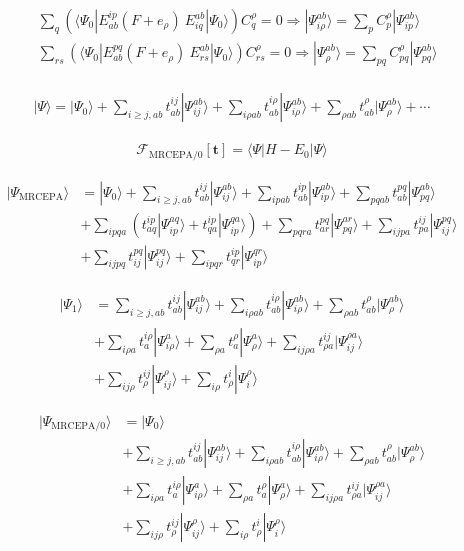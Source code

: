 \documentclass[11pt,pra,aps]{revtex4}
\begin{document}
\begin{align}
  &\sum_q \left(\langle\Psi_0|E_{ab}^{ip}(F+e_\rho)\ E^{ab}_{iq}|\Psi_0\rangle\right) C_q^\rho=0\Rightarrow |\Psi_{i\rho}^{ab}\rangle=\sum_{p} C_{p}^{\rho} |\Psi_{ip}^{ab}\rangle \\
  &\sum_{rs} \left(\langle\Psi_0|E_{ab}^{pq}(F+e_\rho)\ E^{ab}_{rs}|\Psi_0\rangle\right) C_{rs}^\rho=0\Rightarrow |\Psi_{\rho}^{ab}\rangle=\sum_{pq} C_{pq}^{\rho} |\Psi_{pq}^{ab}\rangle \\ 
\end{align}

\begin{align}
|\Psi\rangle=|\Psi_0\rangle+\sum_{i\geq j,ab}t_{ab}^{ij}|\Psi_{ij}^{ab}\rangle+\sum_{i\rho ab}t_{ab}^{i\rho}|\Psi_{i\rho}^{ab}\rangle+\sum_{\rho ab}t_{ab}^{\rho}|\Psi_{\rho}^{ab}\rangle+\cdots
\end{align}

\begin{align}
  \mathscr{F}_\text{MRCEPA/0}[\mathbf{t}]=\langle\Psi|H-E_0|\Psi\rangle
\end{align}

\begin{align}
  |\Psi_\text{MRCEPA}\rangle&=|\Psi_0\rangle+\sum_{i\geq j,ab}t_{ab}^{ij}|\Psi_{ij}^{ab}\rangle+\sum_{ip ab}t_{ab}^{ip}|\Psi_{ip}^{ab}\rangle+\sum_{pq ab}t_{ab}^{pq}|\Psi_{pq}^{ab}\rangle \\
  &+\sum_{ipqa}\left(t^{ip}_{aq}|\Psi_{ip}^{aq}\rangle+t^{ip}_{qa}|\Psi_{ip}^{qa}\rangle\right)+\sum_{pqra}t_{ar}^{pq}|\Psi_{pq}^{ar}\rangle+\sum_{ijpa}t_{pa}^{ij}|\Psi_{ij}^{pq}\rangle \\
  &+\sum_{ijpq}t_{ij}^{pq}|\Psi_{ij}^{pq}\rangle+\sum_{ipqr}t_{qr}^{ip}|\Psi_{ip}^{qr}\rangle
\end{align}

\begin{align}
  |\Psi_1\rangle&=\sum_{i\geq j,ab}t_{ab}^{ij}|\Psi_{ij}^{ab}\rangle+\sum_{i\rho ab}t_{ab}^{i\rho}|\Psi_{i\rho}^{ab}\rangle+\sum_{\rho ab}t_{ab}^{\rho}|\Psi_{\rho}^{ab}\rangle \\
  &+\sum_{i\rho a} t_a^{i\rho} |\Psi_{i\rho}^a\rangle+\sum_{\rho a} t_{a}^\rho|\Psi_\rho^a\rangle+\sum_{ij\rho a} t_{\rho a}^{ij} |\Psi_{ij}^{\rho a}\rangle \\
  &+\sum_{ij\rho} t^{ij}_\rho|\Psi_{ij}^\rho\rangle+\sum_{i\rho} t_\rho^i|\Psi_i^\rho\rangle
\end{align}

\begin{align}
  |\Psi_\text{MRCEPA/0}\rangle&=|\Psi_0\rangle \\
  &+\sum_{i\geq j,ab}t_{ab}^{ij}|\Psi_{ij}^{ab}\rangle+\sum_{i\rho ab}t_{ab}^{i\rho}|\Psi_{i\rho}^{ab}\rangle+\sum_{\rho ab}t_{ab}^{\rho}|\Psi_{\rho}^{ab}\rangle \\
  &+\sum_{i\rho a} t_a^{i\rho} |\Psi_{i\rho}^a\rangle+\sum_{\rho a} t_{a}^\rho|\Psi_\rho^a\rangle+\sum_{ij\rho a} t_{\rho a}^{ij} |\Psi_{ij}^{\rho a}\rangle \\
  &+\sum_{ij\rho} t^{ij}_\rho|\Psi_{ij}^\rho\rangle+\sum_{i\rho} t_\rho^i|\Psi_i^\rho\rangle
\end{align}
\end{document}
